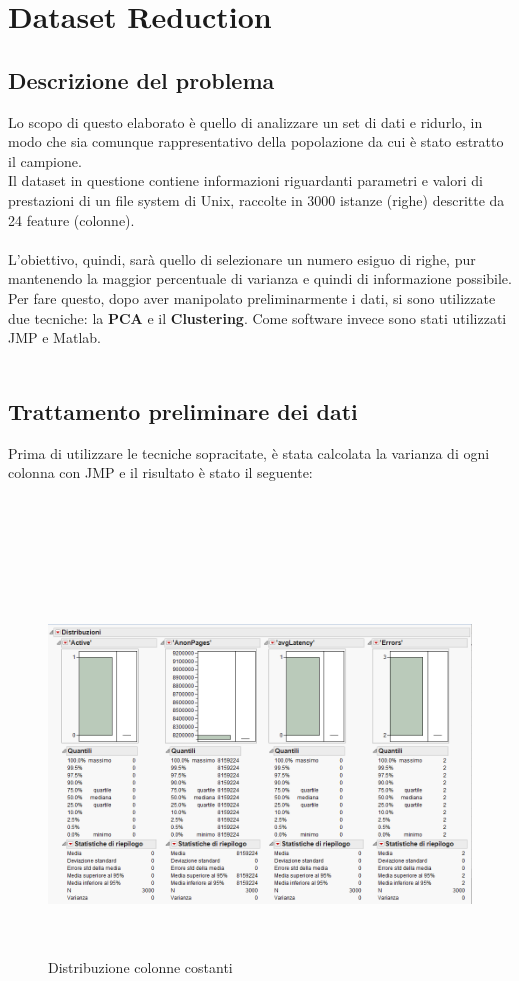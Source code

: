 \chapter{Dataset Reduction}

\section{Descrizione del problema}
Lo scopo di questo elaborato è quello di analizzare un set di dati e ridurlo, in modo che sia comunque rappresentativo della popolazione da cui è stato estratto il campione.\\
Il dataset in questione contiene informazioni riguardanti parametri e valori di prestazioni di un file system di Unix, raccolte in 3000 istanze (righe) descritte da 24 feature (colonne).\\\\
L'obiettivo, quindi, sarà quello di selezionare un numero esiguo di righe, pur mantenendo la maggior percentuale di varianza e quindi di informazione possibile.\\
Per fare questo, dopo aver manipolato preliminarmente i dati, si sono utilizzate due tecniche: la \textbf{PCA} e il \textbf{Clustering}. Come software invece sono stati utilizzati JMP e Matlab.\\\\

\section{Trattamento preliminare dei dati}
Prima di utilizzare le tecniche sopracitate, è stata calcolata la varianza di ogni colonna con JMP e il risultato è stato il seguente:\\\\\\\\\\

\begin{figure}[!h]
	\centering
	\includegraphics[width=15cm, height=10cm]{./immagine/colonne_costanti.png}
	\caption{Distribuzione colonne costanti}
	\label{fig:colonne_costanti}
\end{figure}

